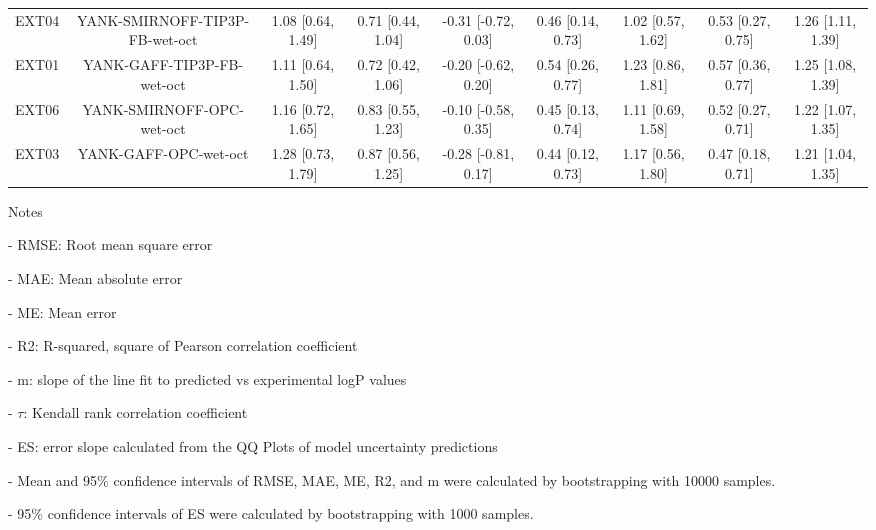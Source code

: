 \documentclass{article}
\begin{document}
\begin{center}
\begin{longtable}{|ccccccccc|}
 EXT04 &  YANK-SMIRNOFF-TIP3P-FB-wet-oct &  1.08 [0.64, 1.49] &  0.71 [0.44, 1.04] &  -0.31 [-0.72, 0.03] &  0.46 [0.14, 0.73] &  1.02 [0.57, 1.62] &  0.53 [0.27, 0.75] &  1.26 [1.11, 1.39] \\
 EXT01 &      YANK-GAFF-TIP3P-FB-wet-oct &  1.11 [0.64, 1.50] &  0.72 [0.42, 1.06] &  -0.20 [-0.62, 0.20] &  0.54 [0.26, 0.77] &  1.23 [0.86, 1.81] &  0.57 [0.36, 0.77] &  1.25 [1.08, 1.39] \\
 EXT06 &       YANK-SMIRNOFF-OPC-wet-oct &  1.16 [0.72, 1.65] &  0.83 [0.55, 1.23] &  -0.10 [-0.58, 0.35] &  0.45 [0.13, 0.74] &  1.11 [0.69, 1.58] &  0.52 [0.27, 0.71] &  1.22 [1.07, 1.35] \\
 EXT03 &           YANK-GAFF-OPC-wet-oct &  1.28 [0.73, 1.79] &  0.87 [0.56, 1.25] &  -0.28 [-0.81, 0.17] &  0.44 [0.12, 0.73] &  1.17 [0.56, 1.80] &  0.47 [0.18, 0.71] &  1.21 [1.04, 1.35] \\
\end{longtable}
\end{center}

Notes

- RMSE: Root mean square error

- MAE: Mean absolute error

- ME: Mean error

- R2: R-squared, square of Pearson correlation coefficient

- m: slope of the line fit to predicted vs experimental logP values

- $\tau$:  Kendall rank correlation coefficient

- ES: error slope calculated from the QQ Plots of model uncertainty predictions

- Mean and 95\% confidence intervals of RMSE, MAE, ME, R2, and m were calculated by bootstrapping with 10000 samples.

- 95\% confidence intervals of ES were calculated by bootstrapping with 1000 samples.\end{document}
\end{document}
